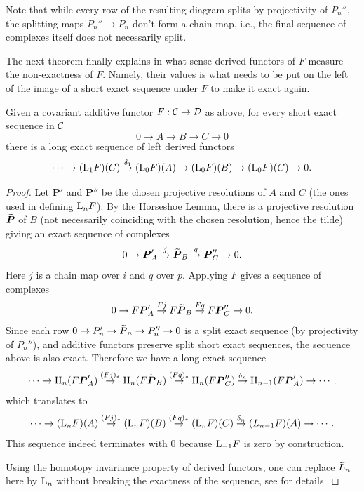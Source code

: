 \begin{rem}
    Note that while every row of the resulting diagram splits by projectivity of $P_n''$, the splitting maps $P_n''\to P_n$ don't form a chain map, i.e., the final sequence of complexes itself does not necessarily split.
\end{rem}

The next theorem finally explains in what sense derived functors of $F$ measure the non-exactness of $F$. Namely, their values is what needs to be put on the left of the image of a short exact sequence under $F$ to make it exact again.

\begin{thm}
    Given a covariant additive functor $F:\mathcal{C}\to\mathcal{D}$ as above, for every short exact sequence in $\mathcal{C}$
    \[0\to A\to B\to C\to 0\]
    there is a long exact sequence of left derived functors 
    \[
    \cdots \to (\mathrm{L}_1 F)(C)\overset{\delta_1}\to (\mathrm{L}_0 F)(A)\to (\mathrm{L}_0 F)(B)\to (\mathrm{L}_0 F)(C)\to 0.
    \]
\end{thm}
\begin{proof}
     Let $\bm{P}'$ and $\bm{P}''$ be the chosen projective resolutions of $A$ and $C$ (the ones used in defining $\mathrm{L}_nF$). By the Horseshoe Lemma, there is a projective resolution $\wt{\bm{P}}$ of $B$ (not necessarily coinciding with the chosen resolution, hence the tilde) giving an exact sequence of complexes
     \[0\to \bm{P}'_{A}\overset j\to \wt{\bm{P}}_B \overset q\to \bm{P}''_{C}\to 0.\]
     Here $j$ is a chain map over $i$ and $q$ over $p$. Applying $F$ gives a sequence of complexes 
     \[0\to F\bm{P}'_{A}\overset {Fj}\to F\wt{\bm{P}}_B \overset {Fq}\to F\bm{P}''_{C}\to 0.\]
     Since each row $0\to P_n' \to \wt{P}_n\to P_n''\to 0$ is a split exact sequence (by projectivity of $P_{n}''$), and additive functors preserve split short exact sequences, the sequence above is also exact. Therefore we have a long exact sequence
     \[\cdots\to \rmH_n(F\bm{P}'_{A})\overset{(Fj)_\ast}\to \rmH_n(F\wt{\bm{P}}_B) \overset {(Fq)_\ast}\to \rmH_n(F\bm{P}''_{C})\overset{\delta_n}\to \rmH_{n-1}(F\bm{P}'_{A})\to \cdots,\]
     which translates to
     \[\cdots\to (\mathrm{L}_nF)(A)\overset{(Fj)_\ast}\to (\mathrm{L}_n F)(B)\overset{(Fq)_\ast}\to (\mathrm{L}_nF)(C)\overset{\delta_n}\to (L_{n-1}F)(A)\to \cdots. \]
     This sequence indeed terminates with $0$ because $\mathrm{L}_{-1}F$ is zero by construction.
     
     Using the homotopy invariance property of derived functors, one can replace $\wt{L}_n$ here by $\mathrm{L}_n$ without breaking the exactness of the sequence, see \cite[Thm. 6.27]{Rotman} for details.
\end{proof}

